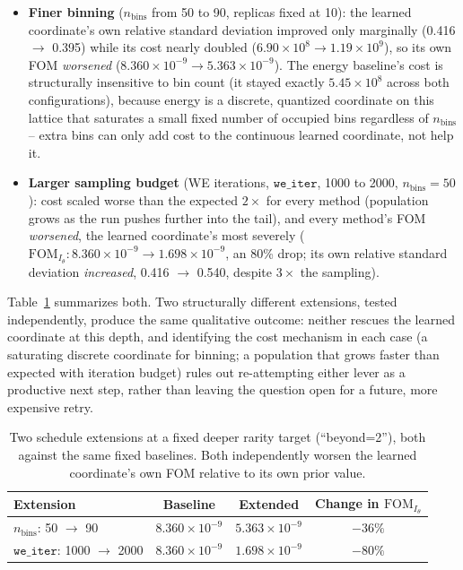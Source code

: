 \documentclass[a4paper,fleqn]{cas-sc}
\newcommand{\FOM}{\mathrm{FOM}}
\begin{document}
\begin{itemize}
\item \textbf{Finer binning} ($n_{\text{bins}}$ from 50 to 90, replicas
fixed at 10): the learned coordinate's own relative standard deviation
improved only marginally (0.416 $\to$ 0.395) while its cost nearly doubled
($6.90\times10^{8} \to 1.19\times10^{9}$), so its own FOM \emph{worsened}
($8.360\times10^{-9} \to 5.363\times10^{-9}$). The energy baseline's cost is
structurally insensitive to bin count (it stayed exactly
$5.45\times10^{8}$ across both configurations), because energy is a
discrete, quantized coordinate on this lattice that saturates a small fixed
number of occupied bins regardless of $n_{\text{bins}}$ -- extra bins can
only add cost to the continuous learned coordinate, not help it.
\item \textbf{Larger sampling budget} (WE iterations, $\mathtt{we\_iter}$,
1000 to 2000, $n_{\text{bins}}=50$): cost scaled worse than the expected
$2\times$ for every method (population grows as the run pushes further into
the tail), and every method's FOM \emph{worsened}, the learned coordinate's
most severely
($\FOM_{I_\theta}: 8.360\times10^{-9} \to 1.698\times10^{-9}$, an 80\%
drop; its own relative standard deviation \emph{increased}, 0.416 $\to$
0.540, despite $3\times$ the sampling).
\end{itemize}

Table~\ref{tab:deadends} summarizes both. Two structurally different
extensions, tested independently, produce the same qualitative outcome:
neither rescues the learned coordinate at this depth, and identifying the
cost mechanism in each case (a saturating discrete coordinate for binning; a
population that grows faster than expected with iteration budget) rules out
re-attempting either lever as a productive next step, rather than leaving
the question open for a future, more expensive retry.

\begin{table}[h]
\centering
\caption{Two schedule extensions at a fixed deeper rarity target
(``beyond=2''), both against the same fixed baselines. Both independently
worsen the learned coordinate's own FOM relative to its own prior value.}
\label{tab:deadends}
\begin{tabular}{lccc}
\toprule
Extension & Baseline & Extended & Change in $\FOM_{I_\theta}$ \\
\midrule
$n_{\text{bins}}$: 50 $\to$ 90 & $8.360\times10^{-9}$ & $5.363\times10^{-9}$ & $-36\%$ \\
$\mathtt{we\_iter}$: 1000 $\to$ 2000 & $8.360\times10^{-9}$ & $1.698\times10^{-9}$ & $-80\%$ \\
\bottomrule
\end{tabular}
\end{table}
\end{document}
